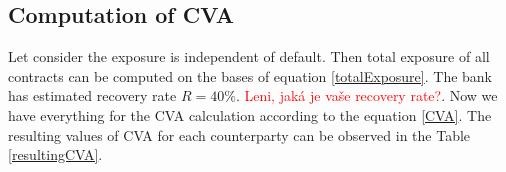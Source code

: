 \documentclass{amsart}
\theoremstyle{definition}\newtheorem{definition}[theorem]{Definition}
\theoremstyle{remark}\newtheorem{remark}[theorem]{Remark}
\begin{document}
\subsection{Computation of CVA} 
Let consider the exposure is independent of default. Then total exposure of all contracts can be computed on the bases of equation \eqref{totalExposure}. The bank has estimated recovery rate $R=40\%$. \textcolor{red}{Leni, jaká je vaše recovery rate?}. Now we have everything for the CVA calculation according to the equation \eqref{CVA}. The resulting values of CVA for each counterparty can be observed in the Table \ref{resultingCVA}.

\begin{table}
\vspace{0,5cm}
\caption{Resulting CVA}
\label{resultingCVA}
\end{table}
\end{document}
